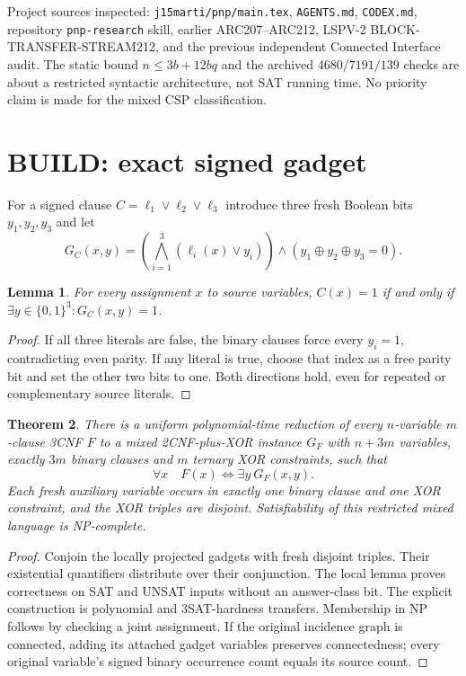 \documentclass[11pt]{article}
\newtheorem{theorem}{Theorem}\newtheorem{lemma}[theorem]{Lemma}
\begin{document}
Project sources inspected: \texttt{j15marti/pnp/main.tex}, \texttt{AGENTS.md}, \texttt{CODEX.md}, repository \texttt{pnp-research} skill, earlier ARC207--ARC212, LSPV-2 BLOCK-TRANSFER-STREAM212, and the previous independent Connected Interface audit. The static bound $n\le3b+12bq$ and the archived $4680/7191/139$ checks are about a restricted syntactic architecture, not SAT running time. No priority claim is made for the mixed CSP classification.

\section{BUILD: exact signed gadget}
For a signed clause $C=\ell_1\vee\ell_2\vee\ell_3$ introduce three fresh Boolean bits $y_1,y_2,y_3$ and let
\[
G_C(x,y)=\left(\bigwedge_{i=1}^{3}(\ell_i(x)\vee y_i)\right)
\wedge(y_1\oplus y_2\oplus y_3=0).
\]
\begin{lemma}For every assignment $x$ to source variables,
$C(x)=1$ if and only if $\exists y\in\{0,1\}^{3}:G_C(x,y)=1$.
\end{lemma}
\begin{proof}If all three literals are false, the binary clauses force every $y_i=1$, contradicting even parity. If any literal is true, choose that index as a free parity bit and set the other two bits to one. Both directions hold, even for repeated or complementary source literals.\end{proof}

\begin{theorem}There is a uniform polynomial-time reduction of every $n$-variable $m$-clause 3CNF $F$ to a mixed 2CNF-plus-XOR instance $G_F$ with $n+3m$ variables, exactly $3m$ binary clauses and $m$ ternary XOR constraints, such that
\[
\forall x\quad F(x)\iff\exists y\ G_F(x,y).
\]
Each fresh auxiliary variable occurs in exactly one binary clause and one XOR constraint, and the XOR triples are disjoint. Satisfiability of this restricted mixed language is NP-complete.
\end{theorem}
\begin{proof}Conjoin the locally projected gadgets with fresh disjoint triples. Their existential quantifiers distribute over their conjunction. The local lemma proves correctness on SAT and UNSAT inputs without an answer-class bit. The explicit construction is polynomial and 3SAT-hardness transfers. Membership in NP follows by checking a joint assignment. If the original incidence graph is connected, adding its attached gadget variables preserves connectedness; every original variable's signed binary occurrence count equals its source count.\end{proof}
\end{document}
